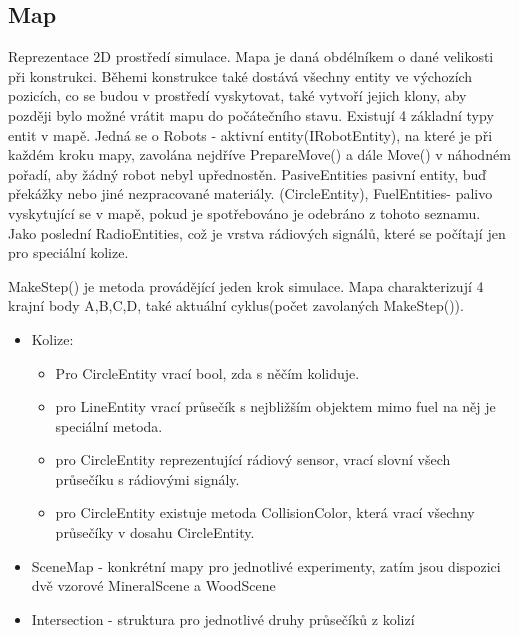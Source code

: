 \documentclass[12pt, oneside]{article}
\begin{document}
\subsection{Map} 
Reprezentace 2D prostředí simulace. Mapa je daná obdélníkem o dané velikosti při konstrukci. Běhemi konstrukce také dostává všechny entity ve výchozích pozicích, co se budou v prostředí vyskytovat, také vytvoří jejich klony, aby později bylo možné vrátit mapu do  počátečního stavu. Existují 4 základní typy entit v mapě. Jedná se o  Robots - aktivní entity(IRobotEntity), na které je při každém kroku mapy, zavolána nejdříve PrepareMove() a dále Move() v náhodném pořadí, aby žádný robot nebyl upřednostěn. PasiveEntities pasivní entity, buď překážky nebo jiné nezpracované materiály. (CircleEntity), FuelEntities- palivo vyskytující se v mapě, pokud je spotřebováno je odebráno z tohoto seznamu. Jako poslední RadioEntities, což je vrstva rádiových signálů, které se počítají jen pro speciální kolize. \par 
MakeStep()  je metoda provádějící jeden krok simulace. 
Mapa charakterizují 4 krajní body A,B,C,D, také aktuální cyklus(počet zavolaných MakeStep()).
\begin{itemize}
\item Kolize: 
\begin{itemize}
\item Pro CircleEntity vrací bool, zda s něčím koliduje. 
\item pro LineEntity vrací průsečík s nejbližším objektem mimo fuel na něj  je speciální metoda. 
\item pro CircleEntity reprezentující rádiový sensor, vrací slovní všech průsečíku s rádiovými  signály. 
\item pro  CircleEntity existuje metoda CollisionColor, která vrací všechny průsečíky v dosahu CircleEntity.
\end{itemize} 
\item SceneMap - konkrétní mapy pro jednotlivé experimenty, zatím jsou dispozici  dvě vzorové MineralScene a WoodScene
\item Intersection - struktura pro  jednotlivé druhy průsečíků z kolizí
\end{itemize} 
\newpage
\end{document}
